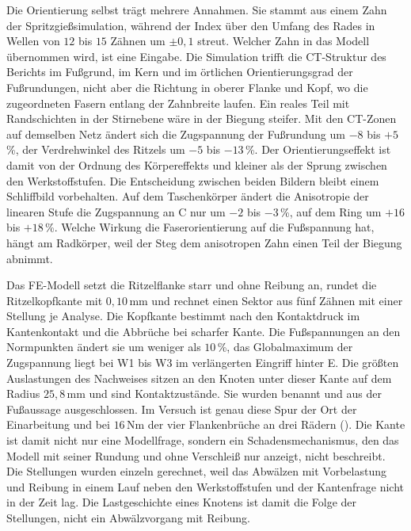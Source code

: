 Die Orientierung selbst trägt mehrere Annahmen. Sie stammt aus einem Zahn der Spritzgießsimulation, während der Index über den Umfang des Rades in Wellen von $12$ bis $15$ Zähnen um $\pm 0{,}1$ streut. Welcher Zahn in das Modell übernommen wird, ist eine Eingabe. Die Simulation trifft die CT-Struktur des Berichts im Fußgrund, im Kern und im örtlichen Orientierungsgrad der Fußrundungen, nicht aber die Richtung in oberer Flanke und Kopf, wo die zugeordneten Fasern entlang der Zahnbreite laufen. Ein reales Teil mit Randschichten in der Stirnebene wäre in der Biegung steifer. Mit den CT-Zonen auf demselben Netz ändert sich die Zugspannung der Fußrundung um $-8$ bis $+5$\,\%, der Verdrehwinkel des Ritzels um $-5$ bis $-13$\,\%. Der Orientierungseffekt ist damit von der Ordnung des Körpereffekts und kleiner als der Sprung zwischen den Werkstoffstufen. Die Entscheidung zwischen beiden Bildern bleibt einem Schliffbild vorbehalten. Auf dem Taschenkörper ändert die Anisotropie der linearen Stufe die Zugspannung an C nur um $-2$ bis $-3$\,\%, auf dem Ring um $+16$ bis $+18$\,\%. Welche Wirkung die Faserorientierung auf die Fußspannung hat, hängt am Radkörper, weil der Steg dem anisotropen Zahn einen Teil der Biegung abnimmt.

Das FE-Modell setzt die Ritzelflanke starr und ohne Reibung an, rundet die Ritzelkopfkante mit $0{,}10$\,mm und rechnet einen Sektor aus fünf Zähnen mit einer Stellung je Analyse. Die Kopfkante bestimmt nach  den Kontaktdruck im Kantenkontakt und die Abbrüche bei scharfer Kante. Die Fußspannungen an den Normpunkten ändert sie um weniger als $10$\,\%, das Globalmaximum der Zugspannung liegt bei W1 bis W3 im verlängerten Eingriff hinter E. Die größten Auslastungen des Nachweises sitzen an den Knoten unter dieser Kante auf dem Radius $25{,}8$\,mm und sind Kontaktzustände. Sie wurden benannt und aus der Fußaussage ausgeschlossen. Im Versuch ist genau diese Spur der Ort der Einarbeitung und bei $16$\,Nm der vier Flankenbrüche an drei Rädern (). Die Kante ist damit nicht nur eine Modellfrage, sondern ein Schadensmechanismus, den das Modell mit seiner Rundung und ohne Verschleiß nur anzeigt, nicht beschreibt. Die Stellungen wurden einzeln gerechnet, weil das Abwälzen mit Vorbelastung und Reibung in einem Lauf neben den Werkstoffstufen und der Kantenfrage nicht in der Zeit lag. Die Lastgeschichte eines Knotens ist damit die Folge der Stellungen, nicht ein Abwälzvorgang mit Reibung.

